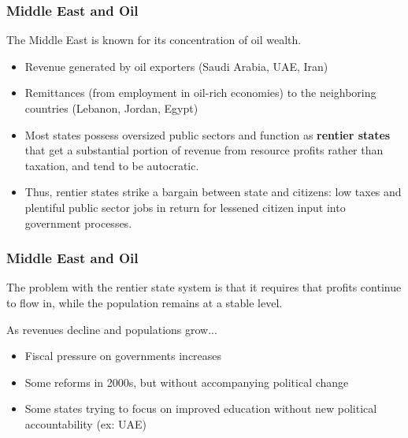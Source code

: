\documentclass[handout]{beamer}
\begin{document}



\begin{frame} 
	\frametitle{\LARGE{Middle East and Oil}}
	\begin{itemize}
		\large{
			\item The Middle East is known for its concentration of oil wealth. \pause
			\begin{itemize}
				\item Revenue generated by oil exporters (Saudi Arabia, UAE, Iran) \pause
				\item Remittances (from employment in oil-rich economies) to the neighboring countries (Lebanon, Jordan, Egypt) \pause
				\item Most states possess oversized public sectors and function as \textbf{rentier states} that get a substantial portion of revenue from resource profits rather than taxation, and tend to be autocratic. \pause
				\item Thus, rentier states strike a bargain between state and citizens: low taxes and plentiful public sector jobs in return for lessened citizen input into government processes.
			\end{itemize}
		}
	\end{itemize}
\end{frame}

\begin{frame} 
	\frametitle{\LARGE{Middle East and Oil}}
	\begin{itemize}
		\large{
			\item The problem with the rentier state system is that it requires that profits continue to flow in, while the population remains at a stable level.
			\item As revenues decline and populations grow...\pause
			\begin{itemize}
				\item Fiscal pressure on governments increases \pause
				\item Some reforms in 2000s, but without accompanying political change\pause
				\item Some states trying to focus on improved education without new political accountability (ex: UAE)
			\end{itemize}
		}
	\end{itemize}
\end{frame}
\end{document}
